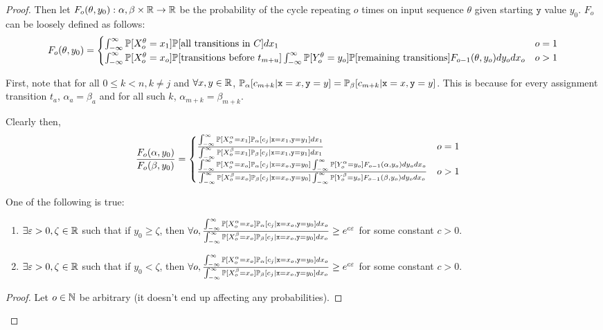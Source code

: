 \begin{proof}
Then let $F_o(\theta, y_0):{\alpha, \beta}\times \mathbb{R} \to \mathbb{R}$ be the probability of the cycle repeating $o$ times on input sequence $\theta$ given starting $\texttt{y}$ value $y_0$. $F_o$ can be loosely defined as follows:\[
	F_o(\theta, y_0) = \begin{cases}
		\int_{-\infty}^\infty  \mathbb{P}[X_o^\theta=x_1]\mathbb{P}[\text{all transitions in }C]dx_1 & o = 1\\
		\int_{-\infty}^\infty \mathbb{P}[X_o^\theta=x_o] \mathbb{P}[\text{transitions before }t_{m+u}]\int_{-\infty}^\infty\mathbb{P}[Y_o^{\theta}=y_o]\mathbb{P}[\text{remaining transitions}] F_{o-1}(\theta, y_o)dy_odx_o & o > 1
	\end{cases}	
\]

First, note that for all $0\leq k<n, k\neq j$ and $\forall x, y\in \mathbb{R}$, $\mathbb{P}_\alpha[c_{m+k}|\texttt{x}=x, \texttt{y}=y] = \mathbb{P}_\beta[c_{m+k}|\texttt{x}=x, \texttt{y}=y]$. This is because for every assignment transition $t_a$, $\alpha_a = \beta_a$ and for all such $k$, $\alpha_{m+k} = \beta_{m+k}$.

Clearly then, \begin{align*}
	\frac{F_o(\alpha, y_0)}{F_o(\beta, y_0)}&=\begin{cases}
		\frac{\int_{-\infty}^\infty  \mathbb{P}[X_o^\alpha=x_1]\mathbb{P}_\alpha[c_j|\texttt{x}=x_1, \texttt{y} = y_1]dx_1}{\int_{-\infty}^\infty  \mathbb{P}[X_o^\beta=x_1]\mathbb{P}_\beta[c_j|\texttt{x}=x_1, \texttt{y} = y_1]dx_1} & o = 1\\
		\frac{\int_{-\infty}^\infty \mathbb{P}[X_o^\alpha=x_o]\mathbb{P}_\alpha[c_j|\texttt{x}=x_o, \texttt{y} = y_0]\int_{-\infty}^\infty\mathbb{P}[Y_o^{\alpha}=y_o]F_{o-1}(\alpha, y_o)dy_odx_o}{\int_{-\infty}^\infty \mathbb{P}[X_o^\beta=x_o]\mathbb{P}_\beta[c_j|\texttt{x}=x_o, \texttt{y} = y_0]\int_{-\infty}^\infty\mathbb{P}[Y_o^{\beta}=y_o]F_{o-1}(\beta, y_o)dy_odx_o} & o > 1
	\end{cases}	
\end{align*}

\begin{lemma}
	One of the following is true: \begin{enumerate}
		\item $\exists \varepsilon>0, \zeta\in \mathbb{R}$ such that if $y_0\geq\zeta$, then $\forall o, \frac{\int_{-\infty}^\infty \mathbb{P}[X_o^\alpha=x_o]\mathbb{P}_\alpha[c_j|\texttt{x}=x_o, \texttt{y} = y_0]dx_o}{\int_{-\infty}^\infty \mathbb{P}[X_o^\beta=x_o]\mathbb{P}_\beta[c_j|\texttt{x}=x_o, \texttt{y} = y_0]dx_o}\geq e^{c\varepsilon}$ for some constant $c>0$.
		\item  $\exists \varepsilon>0, \zeta\in \mathbb{R}$ such that if $y_0<\zeta$, then $\forall o, \frac{\int_{-\infty}^\infty \mathbb{P}[X_o^\alpha=x_o]\mathbb{P}_\alpha[c_j|\texttt{x}=x_o, \texttt{y} = y_0]dx_o}{\int_{-\infty}^\infty \mathbb{P}[X_o^\beta=x_o]\mathbb{P}_\beta[c_j|\texttt{x}=x_o, \texttt{y} = y_0]dx_o}\geq e^{c\varepsilon}$ for some constant $c>0$.
	\end{enumerate}
\end{lemma}
\begin{proof}
	Let $o\in \mathbb{N}$ be arbitrary (it doesn't end up affecting any probabilities). 


\end{proof}
\end{proof}
